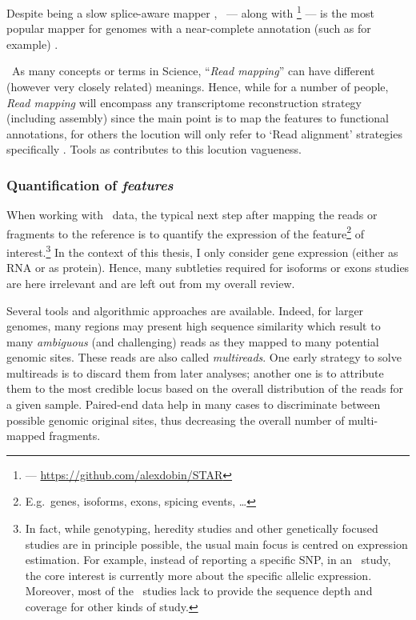 Despite being a slow splice-aware mapper ,
\toph\ --- along with
\footnote{ --- \href{https://github.com/alexdobin/STAR}%
{https://github.com/alexdobin/STAR}}  --- is the most
popular mapper for genomes with a near-complete annotation (such as
 for example) .


\NB\ As many concepts or terms in Science, \enquote{\emph{Read mapping}} can
have different (however very closely related) meanings.
Hence, while for a number of people, \emph{Read mapping} will encompass any
transcriptome reconstruction strategy (including  assembly) since
the main point is to map the features to functional annotations, for others the
locution will only refer to `Read alignment' strategies specifically
. Tools as  contributes to this
locution vagueness.

\subsubsection{Quantification of \emph{features}}

When working with \Rnaseq\ data, the typical next step after mapping the reads or
fragments to the reference is to quantify the expression of the
feature\footnote{E.g.\ genes, isoforms, exons, spicing events, \ldots}
of interest.\footnote{In fact, while genotyping, heredity
studies and other genetically focused studies are in principle possible, the usual
main focus is centred on expression estimation. For example, instead of
reporting a specific \gls{SNP}, in an \Rnaseq\ study, the core interest is
currently more about the specific allelic expression. Moreover, most of the \Rnaseq\
studies lack to provide the sequence depth and coverage for other kinds of study.}
In the context of this thesis, I only consider gene expression (either as \gls{RNA}
or as protein). Hence, many subtleties required for isoforms or exons studies are
here irrelevant and are left out from my overall review.

Several tools and algorithmic approaches are available.
Indeed, for larger genomes, many regions may present high sequence similarity
which result to many \emph{ambiguous} (and challenging) reads as they mapped to
many potential genomic sites. These reads are also called \emph{multireads}.
One early strategy to solve multireads is to discard them from later analyses;
another one is to attribute them to the most credible locus based on
the overall distribution of the reads for a given sample. 
Paired-end data help in many cases to discriminate between possible genomic
original sites, thus decreasing the overall number of multi-mapped fragments.


